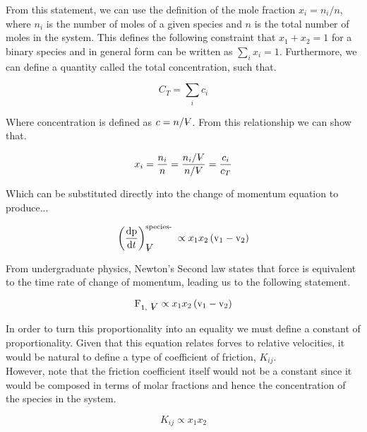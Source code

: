 \documentclass[lettersize,journal]{IEEEtran}
\newcommand{\volume}{{\ooalign{\hfil$V$\hfil\cr\kern0.08em--\hfil\cr}}}
\begin{document}
From this statement, we can use the definition of the mole fraction $x_i = n_i /n$, where $n_i$ is the number of moles of a given species and $n$ is the total number of moles in the system. This defines the following constraint that $x_1 + x_2 = 1$ for a binary species and in general form can be written as $\sum_i x_i = 1$. Furthermore, we can define a quantity called the total concentration, such that.

\begin{equation}
  C_{T}=\sum_{i} c_{i}
\end{equation}

Where concentration is defined as $c = n/ \volume$.  From this relationship we can show that.

\begin{equation}
  x_{i}=\frac{n_{i}}{n}=\frac{n_{i} / \volume}{n / \volume}=\frac{c_{i}}{c_{T}}
\end{equation}

Which can be substituted directly into the change of momentum equation to produce...

\begin{equation}
  \left(\frac{\mathrm{d} \mathrm{p}}{\mathrm{d} t}\right)_{\volume}^{\text {species- }} \propto x_{1} x_{2}\left(\mathrm{v}_{1}-\mathrm{v}_{2}\right)
\end{equation}

From undergraduate physics, Newton's Second law states that force is equivalent to the time rate of change of momentum, leading us to the following statement.

\begin{equation}
  \mathrm{F}_{1, \mathrm{~\volume}} \propto x_{1} x_{2}\left(\mathrm{v}_{1}-\mathrm{v}_{2}\right)
\end{equation}

In order to turn this proportionality into an equality we must define a constant of proportionality. Given that this equation relates forves to relative velocities, it would be natural to define a type of coefficient of friction, $K_{ij}$. \\

However, note that the friction coefficient itself would not be a constant since it would be composed in terms of molar fractions and hence the concentration of the species in the system.

\begin{equation}
  K_{i j} \propto x_{1}x_{2}
\end{equation}
\end{document}
